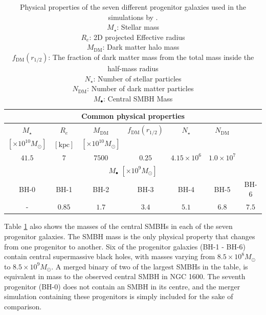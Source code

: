 \documentclass[english, twoside]{HYgradu}
\begin{document}
\begin{table}
	\begin{center}
		\begin{tabular}{| c c c c c c c |}
		\hline
		\multicolumn{7}{|c|}{Common physical properties} \\
		\hline
		$M_\star$ & $R_e$ & $M_\mathrm{DM}$ & $f_\mathrm{DM}(r_{1/2})$ & $N_\star$ & $N_\mathrm{DM}$ & \\
		$[\times 10^{10} M_\odot]$ & $\mathrm{[kpc]}$ & $[\times 10^{10} M_\odot]$ & & & & \\
		$41.5$ & $7$ & $7500$ & $0.25$ & $4.15 \times 10^6$ & $1.0 \times 10^7$ & \\
		\hline
		\hline
		\multicolumn{7}{|c|}{$M_\bullet$ $[\times10^{9} M_\odot]$} \\
		\hline
		BH-0 & BH-1 & BH-2 & BH-3 & BH-4 & BH-5 & BH-6 \\
		- & $0.85$ & $1.7$ & $3.4$ & $5.1$ & $6.8$ & $7.5$ \\
		\hline
		\end{tabular}
	\end{center}
	\caption{Physical properties of the seven different progenitor galaxies used in the simulations by \cite{Rantala2018}. \\
	$M_\star$: Stellar mass \\
	$R_e$: 2D projected Effective radius \\
	$M_\mathrm{DM}$: Dark matter halo mass \\
	$f_\mathrm{DM}(r_{1/2})$: The fraction of dark matter mass from the total mass inside the half-mass radius \\
	$N_\star$: Number of stellar particles \\
	$N_\mathrm{DM}$: Number of dark matter particles \\
	$M_\bullet$: Central SMBH Mass}
	\label{table:properties}
\end{table}

Table \ref{table:properties} also shows the masses of the central SMBHs in each of the seven progenitor galaxies. The SMBH mass is the only physical property that changes from one progenitor to another. Six of the progenitor galaxies (BH-1 - BH-6) contain central supermassive black holes, with masses varying from $8.5 \times 10^8 M_\odot$ to $8.5 \times 10^9 M_\odot$. A merged binary of two of the largest SMBHs in the table, is equivalent in mass to the observed central SMBH in NGC 1600. The seventh progenitor (BH-0) does not contain an SMBH in its centre, and the merger simulation containing these progenitors is simply included for the sake of comparison.
\end{document}

